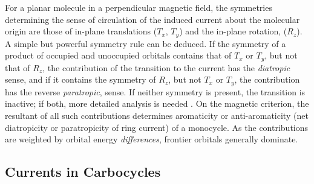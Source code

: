 For a planar molecule in a perpendicular magnetic field, the symmetries determining the sense of circulation of the induced current about the molecular origin are those of in-plane translations ($T_x$, $T_y$) and the in-plane rotation, ($R_z$). A simple but powerful symmetry rule can be deduced. If the symmetry of a product of occupied and unoccupied orbitals contains that of $T_x$ or $T_y$, but not that of $R_z$, the contribution of the transition to the current has the \textit{diatropic} sense, and if it contains the symmetry of $R_z$, but not $T_x$ or $T_y$, the contribution has the reverse \textit{paratropic}, sense. If neither symmetry is present, the transition is inactive; if both, more detailed analysis is needed \cite{r03,r19}. On the magnetic criterion, the resultant of all such contributions determines aromaticity or anti-aromaticity (net diatropicity or paratropicity of ring current) of a monocycle. As the contributions are weighted by orbital energy \textit{differences}, frontier orbitals generally dominate.

\subsection{Currents in Carbocycles}

